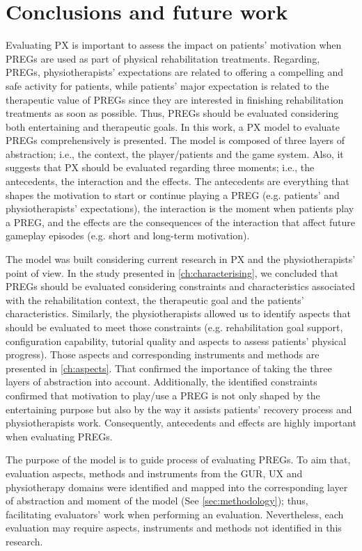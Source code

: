 \chapter{Conclusions and future work}
\label{ch:conclusions}
Evaluating \ac{PX} is important to assess the impact on patients' motivation when \acp{PREG} are used as part of physical rehabilitation treatments. Regarding, \acp{PREG}, physiotherapists' expectations are related to offering a compelling and safe activity for patients, while patients' major expectation is related to the therapeutic value of \acp{PREG} since they are interested in finishing rehabilitation treatments as soon as possible. Thus, \acp{PREG} should be evaluated considering both entertaining and therapeutic goals. In this work, a \ac{PX} model to evaluate \acp{PREG} comprehensively is presented. The model is composed of three layers of abstraction; i.e., the context, the player/patients and the game system. Also, it suggests that \ac{PX} should be evaluated regarding three moments; i.e., the antecedents, the interaction and the effects. The antecedents are everything that shapes the motivation to start or continue playing a \ac{PREG} (e.g. patients' and physiotherapists' expectations), the interaction is the moment when patients play a \ac{PREG}, and the effects are the consequences of the interaction that affect future gameplay episodes (e.g. short and long-term motivation).

The model was built considering current research in \ac{PX} and the physiotherapists' point of view. In the study presented in \autoref{ch:characterising}, we concluded that \acp{PREG} should be evaluated considering constraints and characteristics associated with the rehabilitation context, the therapeutic goal and the patients' characteristics. Similarly, the physiotherapists allowed us to identify aspects that should be evaluated to meet those constraints (e.g. rehabilitation goal support, configuration capability, tutorial quality and aspects to assess patients' physical progress). Those aspects and corresponding instruments and methods are presented in \autoref{ch:aspects}. That confirmed the importance of taking the three layers of abstraction into account. Additionally, the identified constraints confirmed that motivation to play/use a \ac{PREG} is not only shaped by the entertaining purpose but also by the way it assists patients' recovery process and physiotherapists work. Consequently, antecedents and effects are highly important when evaluating \acp{PREG}.

The purpose of the model is to guide process of evaluating \acp{PREG}. To aim that, evaluation aspects, methods and instruments from the \ac{GUR}, \ac{UX} and physiotherapy domains were identified and mapped into the corresponding layer of abstraction and moment of the model (See \autoref{sec:methodology}); thus, facilitating evaluators' work when performing an evaluation. Nevertheless, each evaluation may require aspects, instruments and methods not identified in this research.

